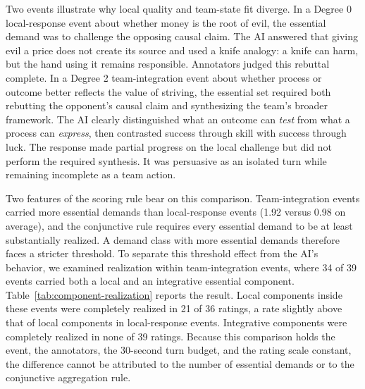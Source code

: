 \documentclass[manuscript,review,anonymous]{acmart}
\begin{document}
Two events illustrate why local quality and team-state fit diverge. In a Degree 0 local-response event about whether money is the root of evil, the essential demand was to challenge the opposing causal claim. The AI answered that giving evil a price does not create its source and used a knife analogy: a knife can harm, but the hand using it remains responsible. Annotators judged this rebuttal complete. In a Degree 2 team-integration event about whether process or outcome better reflects the value of striving, the essential set required both rebutting the opponent's causal claim and synthesizing the team's broader framework. The AI clearly distinguished what an outcome can \emph{test} from what a process can \emph{express}, then contrasted success through skill with success through luck. The response made partial progress on the local challenge but did not perform the required synthesis. It was persuasive as an isolated turn while remaining incomplete as a team action.

Two features of the scoring rule bear on this comparison. Team-integration events carried more essential demands than local-response events (1.92 versus 0.98 on average), and the conjunctive rule requires every essential demand to be at least substantially realized. A demand class with more essential demands therefore faces a stricter threshold. To separate this threshold effect from the AI's behavior, we examined realization within team-integration events, where 34 of 39 events carried both a local and an integrative essential component. Table~\ref{tab:component-realization} reports the result. Local components inside these events were completely realized in 21 of 36 ratings, a rate slightly above that of local components in local-response events. Integrative components were completely realized in none of 39 ratings. Because this comparison holds the event, the annotators, the 30-second turn budget, and the rating scale constant, the difference cannot be attributed to the number of essential demands or to the conjunctive aggregation rule.
\end{document}
